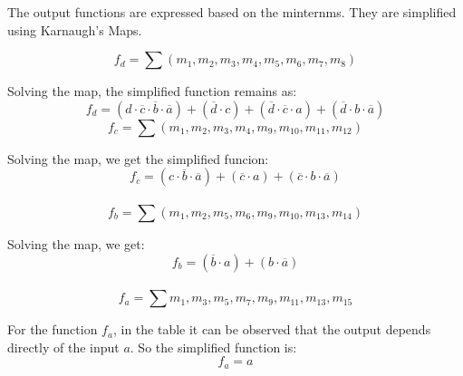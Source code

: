         \par
        The output functions are expressed based on the minternms.
        They are simplified using Karnaugh's Maps.\par
        \[
            f_{d}=\sum{(m_1,m_2,m_3,m_4,m_5,m_6,m_7,m_8)}
        \]
        \begin{centering}
            \begin{Karnaugh}
            \end{Karnaugh}
        \par\end{centering}
        Solving the map, the simplified function remains as:
        \[
            \boxed{f_{d}=(d \cdot \overline{c} \cdot \overline{b} \cdot \overline{a})+
            (\overline{d} \cdot c)+(\overline{d} \cdot \overline{c} \cdot a)+
            (\overline{d} \cdot b \cdot \overline{a})}    
        \]
        \newpage
        \[
            f_{c}=\sum{(m_1,m_2,m_3,m_4,m_9,m_{10},m_{11},m_{12})}
        \]
        \begin{centering}
            \begin{Karnaugh}
            \end{Karnaugh}
        \par\end{centering}
        Solving the map, we get the simplified funcion:
        \[
            \boxed{f_c=(c \cdot \overline{b} \cdot \overline{a})+
            (\overline{c} \cdot a)+
            (\overline{c} \cdot b \cdot \overline{a})}    
        \]\\
        \[
            f_{b}=\sum{(m_1,m_2,m_5,m_6,m_9,m_{10},m_{13},m_{14})}    
        \]
        \begin{centering}
            \begin{Karnaugh}
            \end{Karnaugh}
        \par\end{centering}
        Solving the map, we get:
        \[
            \boxed{f_b=(\overline{b} \cdot a)+(b \cdot \overline{a})}    
        \]\\
        \[
            f_{a}=\sum{m_1,m_3,m_5,m_7,m_9,m_{11},m_{13},m_{15}}    
        \]\par
        For the function $f_a$, in the table it can be observed that 
        the output depends directly of the input $a$. So the simplified 
        function is:
        \[
            \boxed{f_a=a}    
        \]

